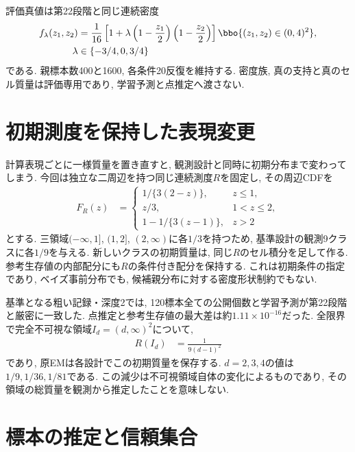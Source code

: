 評価真値は第22段階と同じ連続密度
\begin{align}
f_\lambda(z_1,z_2)
&=\frac1{16}\left[1+\lambda
\left(1-\frac{z_1}{2}\right)\left(1-\frac{z_2}{2}\right)\right]
\bbo\{(z_1,z_2)\in(0,4)^2\},
\label{eq:stage23_true_density}\\
\lambda&\in\{-3/4,0,3/4\}
\label{eq:stage23_true_parameters}
\end{align}
である.
親標本数400と1600, 各条件20反復を維持する.
密度族, 真の支持と真のセル質量は評価専用であり,
学習予測と点推定へ渡さない.

\section{初期測度を保持した表現変更}
\label{sec:stage23_reference_measure}

計算表現ごとに一様質量を置き直すと,
観測設計と同時に初期分布まで変わってしまう.
今回は独立な二周辺を持つ同じ連続測度$R$を固定し,
その周辺CDFを
\begin{align}
F_R(z)&=\begin{cases}
1/\{3(2-z)\},&z\le1,\\
z/3,&1<z\le2,\\
1-1/\{3(z-1)\},&z>2
\end{cases}
\label{eq:stage23_reference_cdf}
\end{align}
とする.
三領域$(-\infty,1]$, $(1,2]$, $(2,\infty)$に各$1/3$を持つため,
基準設計の観測9クラスに各$1/9$を与える.
新しいクラスの初期質量は, 同じ$R$のセル積分を足して作る.
参考生存値の内部配分にも$R$の条件付き配分を保持する.
これは初期条件の指定であり, ベイズ事前分布でも,
候補親分布に対する密度形状制約でもない.

基準となる粗い記録・深度2では,
120標本全ての公開個数と学習予測が第22段階と厳密に一致した.
点推定と参考生存値の最大差は約$1.11\times10^{-16}$だった.
全限界で完全不可視な領域$I_d=(d,\infty)^2$について,
\begin{align}
R(I_d)&=\frac{1}{9(d-1)^2}
\label{eq:stage23_initial_invisible_mass}
\end{align}
であり, 原EMは各設計でこの初期質量を保存する.
$d=2,3,4$の値は$1/9,1/36,1/81$である.
この減少は不可視領域自体の変化によるものであり,
その領域の総質量を観測から推定したことを意味しない.

\section{標本の推定と信頼集合}
\label{sec:stage23_sample_inference}


